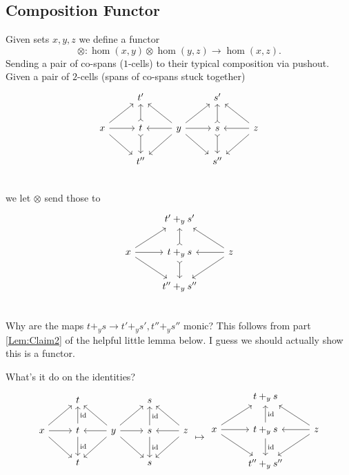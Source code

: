 \documentclass[12pt]{article}
\newcommand{\from}{\colon}
\renewcommand{\(}{\left(}
\renewcommand{\)}{\right)}
\renewcommand{\{}{\left\lbrace}
\renewcommand{\}}{\right\rbrace}
\DeclareMathOperator{\id}{id}
\theoremstyle{remark}
\theoremstyle{definition}
\begin{document}
\subsection*{Composition Functor}

Given sets $x,y,z$ we define a functor
\[
	\otimes \from 
		\hom (x,y) \otimes \hom (y,z) \to \hom (x,z).
\]
Sending a pair of co-spans ($1$-cells) to their typical composition via pushout.  Given a pair of $2$-cells (spans of co-spans stuck together)
\[
	\begin{tikzcd}
		{} &
		{t'} & 
		{} &
		{s'} &
		{} \\
		{x} 
			\ar[ru]
			\ar[r]
			\ar[rd] &
		{t}
			\ar[d, rightarrowtail]
			\ar[u, rightarrowtail] & 
		{y} 
			\ar[lu]
			\ar[l]
			\ar[ld]
			\ar[ru]
			\ar[r]
			\ar[rd] &
		{s} 
			\ar[d, rightarrowtail]
			\ar[u, rightarrowtail] &
		{z} 
			\ar[lu]
			\ar[l]
			\ar[ld] \\
		{} &
		{t''} & 
		{} &
		{s''} &
		{} \\
	\end{tikzcd}
\]
we let $\otimes$ send those to
\[
	\begin{tikzcd}
		{} &
		{t'+_y s'} &
		{} \\
		{x} 
			\ar[ur] 
			\ar[r]
			\ar[dr] &
		{t +_y s} 
			\ar[u, rightarrowtail]
			\ar[d, rightarrowtail] &
		{z} 
			\ar[ul]
			\ar[l]
			\ar[dl] \\
		{} &
		{t'' +_y s''} &
		{} \\
	\end{tikzcd}
\]
Why are the maps $t+_y s \to t' +_y s', t'' +_y s''$ monic? This follows from part \ref{Lem:Claim2} of the helpful little lemma below. I guess we should actually show this is a functor.

What's it do on the identities? 
\[
	\begin{tikzcd}
		{} &
		{t} & 
		{} &
		{s} &
		{} \\
		{x} 
			\ar[ru]
			\ar[r]
			\ar[rd] &
		{t}
			\ar[d, "\id"]
			\ar[u, swap, "\id"] & 
		{y} 
			\ar[lu]
			\ar[l]
			\ar[ld]
			\ar[ru]
			\ar[r]
			\ar[rd] &
		{s} 
			\ar[d, "\id"]
			\ar[u, swap, "\id"] &
		{z} 
			\ar[lu]
			\ar[l]
			\ar[ld] \\
		{} &
		{t} & 
		{} &
		{s} &
		{} \\
	\end{tikzcd}
	\mapsto
	\begin{tikzcd}
		{} &
		{t+_y s} &
		{} \\
		{x} 
			\ar[ur] 
			\ar[r]
			\ar[dr] &
		{t +_y s} 
			\ar[u, ,swap, "\id"]
			\ar[d, "\id"] &
		{z} 
			\ar[ul]
			\ar[l]
			\ar[dl] \\
		{} &
		{t'' +_y s''} &
		{} \\
	\end{tikzcd}
\]
\end{document}
